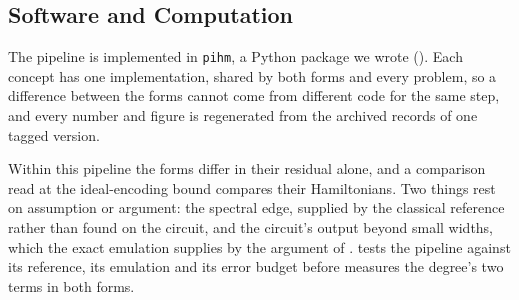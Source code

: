 \subsection{Software and Computation}
\label{sec:pipeline-software}

The pipeline is implemented in \texttt{pihm}, a Python package we wrote (). Each concept has one implementation, shared by both forms and every problem, so a difference between the forms cannot come from different code for the same step, and every number and figure is regenerated from the archived records of one tagged version.

Within this pipeline the forms differ in their residual alone, and a comparison read at the ideal-encoding bound compares their Hamiltonians. Two things rest on assumption or argument: the spectral edge, supplied by the classical reference rather than found on the circuit, and the circuit's output beyond small widths, which the exact emulation supplies by the argument of .  tests the pipeline against its reference, its emulation and its error budget before  measures the degree's two terms in both forms.

